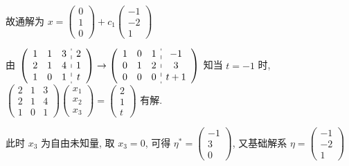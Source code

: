 \begin{enumerate}
			       故通解为 \( x = \begin{pmatrix}
				       0 \\
				       1 \\
				       0
			       \end{pmatrix} + c_{1}\begin{pmatrix}
				       -1 \\
				       -2 \\
				       1
			       \end{pmatrix} \)

			       由 \( \left(\begin{array}{ccc:c}
					       1 & 1 & 3 & 2 \\
					       2 & 1 & 4 & 1 \\
					       1 & 0 & 1 & t
				       \end{array}\right)
			       \to
			       \left(\begin{array}{ccc:c}
					       1 & 0 & 1 & -1  \\
					       0 & 1 & 2 & 3   \\
					       0 & 0 & 0 & t+1
				       \end{array}\right) \) 知当 \( t = -1 \) 时, \( \begin{pmatrix}
				       2 & 1 & 3 \\
				       2 & 1 & 4 \\
				       1 & 0 & 1
			       \end{pmatrix}\begin{pmatrix}
				       x_{1} \\
				       x_{2} \\
				       x_{3}
			       \end{pmatrix} = \begin{pmatrix}
				       2 \\
				       1 \\
				       t
			       \end{pmatrix} \) 有解.

			       此时 \( x_{3} \) 为自由未知量, 取 \( x_{3} = 0 \), 可得 \( \eta^{*} = \begin{pmatrix}
				       -1 \\
				       3  \\
				       0
			       \end{pmatrix} \), 又基础解系 \( \eta = \begin{pmatrix}
				       -1 \\
				       -2 \\
				       1
			       \end{pmatrix} \)


\end{enumerate}
